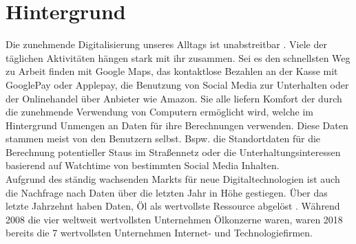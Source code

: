 \documentclass[11pt,a4paper]{scrreprt}
\begin{document}
\chapter{Hintergrund}
Die zunehmende Digitalisierung unseres Alltags ist unabstreitbar \cite{dt-digitalisierung-stat}. Viele der täglichen Aktivitäten hängen stark mit ihr zusammen. Sei es den schnellsten Weg zu Arbeit finden mit Google Maps, das kontaktlose Bezahlen an der Kasse mit GooglePay oder Applepay, die Benutzung von Social Media zur Unterhalten oder der Onlinehandel über Anbieter wie Amazon. Sie alle liefern Komfort der durch die zunehmende Verwendung von Computern ermöglicht wird, welche im Hintergrund Unmengen an Daten für ihre Berechnungen verwenden. Diese Daten stammen meist von den Benutzern selbst. Bspw. die Standortdaten für die Berechnung potentieller Staus im Straßennetz \cite{dt-googlemaps-staus} oder die Unterhaltungsinteressen basierend auf Watchtime von bestimmten Social Media Inhalten. \\
Aufgrund des ständig wachsenden Markts für neue Digitaltechnologien ist auch die Nachfrage nach Daten über die letzten Jahr in Höhe gestiegen. Über das letzte Jahrzehnt haben Daten, Öl als wertvollste Ressource abgelöst \cite{dt-falck2020rohstoff}. Während 2008 die vier weltweit wertvollsten Unternehmen Ölkonzerne waren, waren 2018 bereits die 7 wertvollsten Unternehmen Internet- und Technologiefirmen. 
\end{document}
